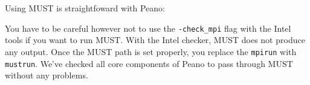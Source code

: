 Using MUST is straightfoward with Peano:


\noindent
You have to be careful however not to use the \texttt{-check\_mpi} flag with the
Intel tools if you want to run MUST.
With the Intel checker, MUST does not produce any output.
Once the MUST path is set properly, you replace the \texttt{mpirun} with
\texttt{mustrun}.
We've checked all core components of Peano to pass through MUST without any
problems.


% 
% 

 
% 
% 
% 
% 
% 
% 
% 
% 
% 
% 
% 
% 
% 
